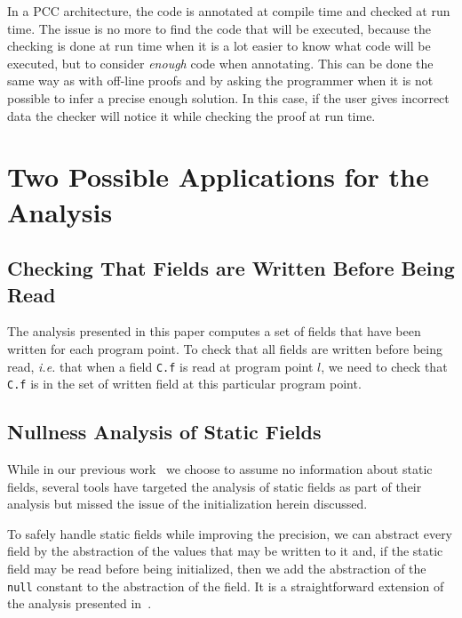 \documentclass{entcs}
\begin{document}
In a PCC architecture, the code is annotated at compile time and
checked at run time.  The issue is no more to find the code that will
be executed, because the checking is done at run time when it is a lot
easier to know what code will be executed, but to consider
\emph{enough} code when annotating.  This can be done the same way as
with off-line proofs and by asking the programmer when it is not
possible to infer a precise enough solution.  In this case, if the
user gives incorrect data the checker will notice it while checking
the proof at run time.


\section{Two Possible Applications for the Analysis}
\label{sec:two-possible-uses}

\subsection{Checking That Fields are Written Before Being Read}
\label{sec:fields-are-written-then-read}

The analysis presented in this paper computes a set of fields that
have been written for each program point.  To check that all fields
are written before being read, \emph{i.e.} that when a field
\texttt{C.f} is read at program point $l$, we need to check that
\texttt{C.f} is in the set of written field at this particular program
point.

\subsection{Nullness Analysis of Static Fields}
\label{sec:nullness-analysis}

While in our previous
work~\cite{hubert08-1:nonnull_annotations_inference} we choose to
assume no information about static fields, several tools have targeted
the analysis of static fields as part of their analysis but missed the
issue of the initialization herein discussed.

To safely handle static fields while improving the precision, we can
abstract every field by the abstraction of the values that may be
written to it and, if the static field may be read before being
initialized, then we add the abstraction of the \texttt{null} constant
to the abstraction of the field.  It is a straightforward extension of
the analysis presented
in~\cite{hubert08-1:nonnull_annotations_inference}.
\end{document}
